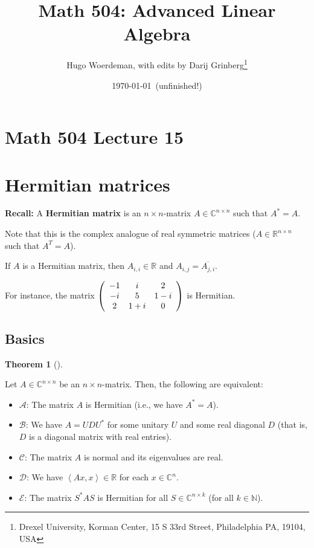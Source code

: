 \documentclass[numbers=enddot,12pt,final,onecolumn,notitlepage]{scrartcl}%
\numberwithin{exer}{subsection}
\theoremstyle{definition}
\newtheorem{theo}{Theorem}[subsection]
\newenvironment{theorem}[1][]
{\begin{theo}[#1]\begin{leftbar}}
{\end{leftbar}\end{theo}}
\begin{document}
\title{Math 504: Advanced Linear Algebra}
\author{Hugo Woerdeman, with edits by Darij Grinberg\thanks{Drexel University, Korman
Center, 15 S 33rd Street, Philadelphia PA, 19104, USA}}
\date{\today\ (unfinished!)}
\maketitle
\tableofcontents

\section*{Math 504 Lecture 15}

\section{Hermitian matrices}

\textbf{Recall:} A \textbf{Hermitian matrix} is an $n\times n$-matrix
$A\in\mathbb{C}^{n\times n}$ such that $A^{\ast}=A$.

Note that this is the complex analogue of real symmetric matrices
($A\in\mathbb{R}^{n\times n}$ such that $A^{T}=A$).

If $A$ is a Hermitian matrix, then $A_{i,i}\in\mathbb{R}$ and $A_{i,j}%
=\overline{A_{j,i}}$.

For instance, the matrix $\left(
\begin{array}
[c]{ccc}%
-1 & i & 2\\
-i & 5 & 1-i\\
2 & 1+i & 0
\end{array}
\right)  $ is Hermitian.

\subsection{Basics}

\begin{theorem}
Let $A\in\mathbb{C}^{n\times n}$ be an $n\times n$-matrix. Then, the following
are equivalent:

\begin{itemize}
\item $\mathcal{A}$: The matrix $A$ is Hermitian (i.e., we have $A^{\ast}=A$).

\item $\mathcal{B}$: We have $A=UDU^{\ast}$ for some unitary $U$ and some real
diagonal $D$ (that is, $D$ is a diagonal matrix with real entries).

\item $\mathcal{C}$: The matrix $A$ is normal and its eigenvalues are real.

\item $\mathcal{D}$: We have $\left\langle Ax,x\right\rangle \in\mathbb{R}$
for each $x\in\mathbb{C}^{n}$.

\item $\mathcal{E}$: The matrix $S^{\ast}AS$ is Hermitian for all
$S\in\mathbb{C}^{n\times k}$ (for all $k\in\mathbb{N}$).
\end{itemize}
\end{theorem}
\end{document}
